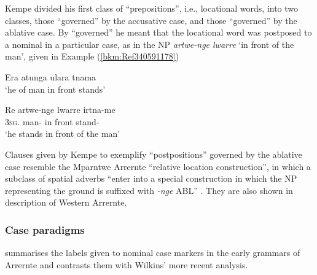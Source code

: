 Kempe divided his first class of ``prepositions'', i.e., locational words, into two classes, those “governed” by the accusative case, and those “governed” by the ablative case. By “governed” he meant that the locational word was postposed to a nominal in a particular case, as in the NP \textit{artwe-nge lwarre} `in front of the man', given in Example (\ref{bkm:Ref340591178})

\ea\label{bkm:Ref340591178}
Era          atunga         ulara        tnama \\
\glt `he             of man         in front    stands' \\
\citep[4]{Kempe1891}

\gll Re          artwe-nge    lwarre    irtna-me \\
3\textsc{sg}.    man-    in{ }front  stand-\\
\glt `he stands in front of the man'
\z

Clauses given by Kempe to exemplify “postpositions” governed by the ablative case resemble the Mparntwe Arrernte “relative location construction'', in which a subclass of spatial adverbs “enter into a special construction in which the NP representing the ground is suffixed with \textit{-nge} ABL” \citep[314]{wilkins_mparntwe_1989}. They are also shown in  description of Western Arrernte.

\subsubsection{Case paradigms}
\label{sec:key:9.3.3.2}\label{bkm:Ref339538382}

 summarises the labels given to nominal case markers in the early grammars of Arrernte and contrasts them with Wilkins' more recent analysis.


